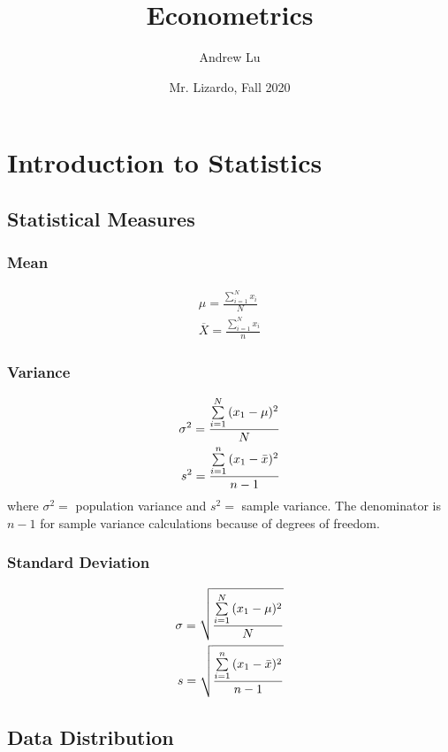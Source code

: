 \documentclass[12pt]{article}
\title{Econometrics}
\author{Andrew Lu}
\date{Mr. Lizardo, Fall 2020}
\numberwithin{equation}{section}
\begin{document}
    \maketitle
    \label{sec:top}
    \tableofcontents

\section{Introduction to Statistics}

\subsection{Statistical Measures}
\subsubsection{Mean}
\begin{align}
    \mu=\frac{\sum\limits_{i=1}^{N}{x_i}}{N} \\
    \overline{X}=\frac{\sum\limits_{i=1}^{N}{x_i}}{n}
\end{align}

\subsubsection{Variance}
\begin{align}
    \sigma^2=\frac{\sum\limits_{i=1}^{N}{(x_1-\mu)^2}}{N} \\
    s^2=\frac{\sum\limits_{i=1}^{n}{(x_1-\Bar{x})^2}}{n-1}
\end{align}
where $\sigma^2=$ population variance and $s^2=$ sample variance. The denominator is $n-1$ for sample variance calculations because of degrees of freedom.

\subsubsection{Standard Deviation}
\begin{align}
    \sigma=\sqrt{\frac{\sum\limits_{i=1}^{N}{(x_1-\mu)^2}}{N}} \\
    s=\sqrt{\frac{\sum\limits_{i=1}^{n}{(x_1-\Bar{x})^2}}{n-1}}
\end{align}

\subsection{Data Distribution}
\end{document}
